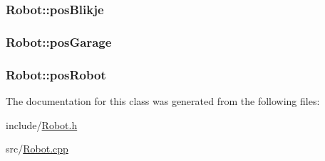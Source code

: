 \hypertarget{classRobot_a430b77999d3080962df243cc80ff41cc}{
\subsubsection[{pos\-Blikje}]{ Robot\-::pos\-Blikje\hspace{0.3cm}{\ttfamily [private]}}}\label{classRobot_a430b77999d3080962df243cc80ff41cc}
\hypertarget{classRobot_a65d03adc264ed54988a63793bd1ee9c5}{
\subsubsection[{pos\-Garage}]{ Robot\-::pos\-Garage\hspace{0.3cm}{\ttfamily [private]}}}\label{classRobot_a65d03adc264ed54988a63793bd1ee9c5}
\hypertarget{classRobot_a9d4895475ce429baafb7056bba91892d}{
\subsubsection[{pos\-Robot}]{ Robot\-::pos\-Robot\hspace{0.3cm}{\ttfamily [private]}}}\label{classRobot_a9d4895475ce429baafb7056bba91892d}


The documentation for this class was generated from the following files\-:\begin{DoxyCompactItemize}
\item 
include/\hyperlink{Robot_8h}{Robot.\-h}\item 
src/\hyperlink{Robot_8cpp}{Robot.\-cpp}\end{DoxyCompactItemize}
